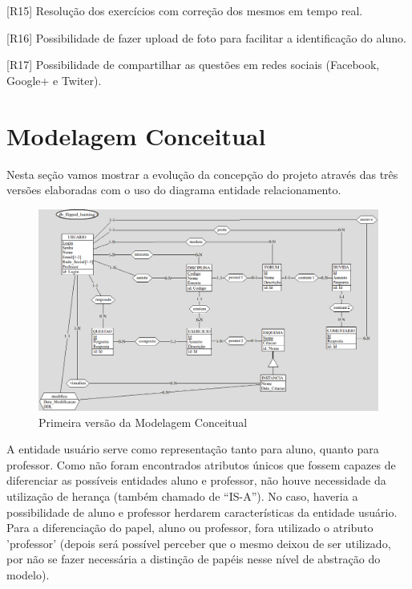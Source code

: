 \documentclass[graduacao,brazil]{ThesisPUC}
\begin{document}
[R15] Resolu\c{c}\~{a}o dos exerc\'{i}cios com corre\c{c}\~{a}o dos mesmos em tempo real.

[R16] Possibilidade de fazer upload de foto para facilitar a identifica\c{c}\~{a}o do aluno.

[R17] Possibilidade de compartilhar as quest\~{o}es em redes sociais (Facebook, Google+ e Twiter).

\section{Modelagem Conceitual}

Nesta se\c{c}\~{a}o vamos mostrar a evolu\c{c}\~{a}o da concep\c{c}\~{a}o do projeto atrav\'{e}s das tr\^{e}s vers\~{o}es
elaboradas com o uso do diagrama entidade relacionamento.

\begin{figure}[H]
    \centering
    \includegraphics[width=\linewidth]{Imagens/ModelagemConceitual_v1_0.png}
    \caption{Primeira versão da Modelagem Conceitual}
\end{figure}

A entidade usu\'{a}rio serve como representa\c{c}\~{a}o tanto para aluno, quanto para professor.
Como n\~{a}o foram encontrados atributos \'{u}nicos que fossem capazes de diferenciar as poss\'{i}veis
entidades aluno e professor, n\~{a}o houve necessidade da utiliza\c{c}\~{a}o de heran\c{c}a (tamb\'{e}m chamado
de “IS-A”). No caso, haveria a possibilidade de aluno e professor herdarem caracter\'{i}sticas da
entidade usu\'{a}rio. Para a diferencia\c{c}\~{a}o do papel, aluno ou professor, fora utilizado o atributo
'professor' (depois ser\'{a} poss\'{i}vel perceber que o mesmo deixou de ser utilizado, por n\~{a}o se fazer
necess\'{a}ria a distin\c{c}\~{a}o de pap\'{e}is nesse n\'{i}vel de abstra\c{c}\~{a}o do modelo).
\end{document}
